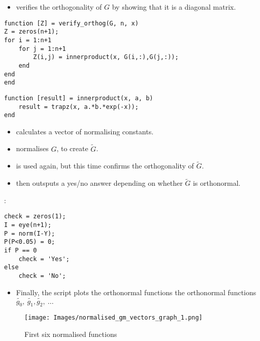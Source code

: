 \documentclass{article}
\begin{document}
\begin{itemize}

\item {} verifies the orthogonality of $G$ by showing that it is a diagonal matrix.

\end{itemize}

\begin{lstlisting}
function [Z] = verify_orthog(G, n, x)
Z = zeros(n+1);
for i = 1:n+1
    for j = 1:n+1
        Z(i,j) = innerproduct(x, G(i,:),G(j,:));
    end
end
end
\end{lstlisting}

\begin{lstlisting}
function [result] = innerproduct(x, a, b)
    result = trapz(x, a.*b.*exp(-x)); 
end
\end{lstlisting}

\begin{itemize}

\item {} calculates a vector of normalising constants.

\item {} normalises $G$, to create $\tilde{G}$.

\item {} is used again, but this time confirms the orthogonality of $\tilde{G}$.

\item {} then outsputs a yes/no answer depending on whether $\tilde{G}$ is orthonormal. 

\end{itemize}

:

\begin{lstlisting}
check = zeros(1);
I = eye(n+1);  
P = norm(I-Y);
P(P<0.05) = 0;
if P == 0
    check = 'Yes';
else
    check = 'No';
\end{lstlisting}

\begin{itemize}

\item Finally, the script plots the orthonormal functions the orthonormal functions $\tilde{g_0},\ \tilde{g_1}, \tilde{g_2},\ ...  $

\end{itemize}

\begin{figure}[h]
\centering
	\begin{minipage}[c][][b]{0.45\linewidth}
		\begin{center}
		\texttt{[image: Images/normalised\_gm\_vectors\_graph\_1.png]}  
		\end{center}
		\caption[b]{First six normalised functions}
		\label{fourierapproximationtriangle}
	\end{minipage}
\end{figure}
\end{document}
